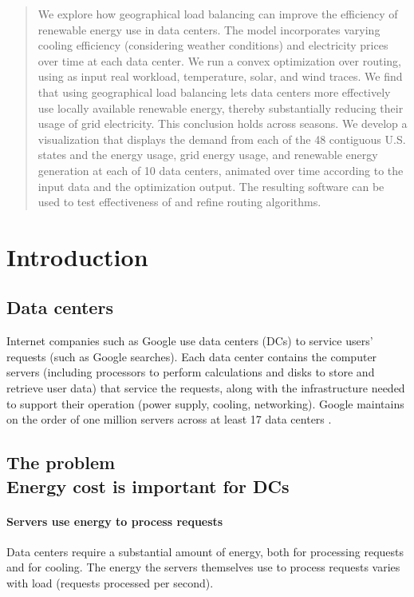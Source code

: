 \documentclass{acm_proc_article-sp}
\begin{document}
\maketitle
\begin{abstract}
We explore how geographical load balancing can improve the efficiency of renewable energy use in data centers.
The model incorporates varying cooling efficiency (considering weather conditions) and electricity prices over time at each data center.
We run a convex optimization over routing, using as input real workload, temperature, solar, and wind traces.
We find that using geographical load balancing lets data centers more effectively use locally available renewable energy, thereby substantially reducing their usage of grid electricity. This conclusion holds across seasons.
We develop a visualization that displays the demand from each of the 48 contiguous U.S. states and the energy usage, grid energy usage, and renewable energy generation at each of 10 data centers, animated over time according to the input data and the optimization output. The resulting software can be used to test effectiveness of and refine routing algorithms.
\end{abstract}

\section{Introduction}

\subsection{Data centers}
		Internet companies such as Google use data centers (DCs) to service users’ requests (such as Google searches). Each data center contains the computer servers (including processors to perform calculations and disks to store and retrieve user data) that service the requests, along with the infrastructure needed to support their operation (power supply, cooling, networking).
		Google maintains on the order of one million servers \cite{google900000} \cite{koomeyreport} across at least 17 data centers \cite{googlenumdcs}.
		
\subsection{The problem\\Energy cost is important for DCs}
		\paragraph{Servers use energy to process requests}
			Data centers require a substantial amount of energy, both for processing requests and for cooling. The energy the servers themselves use to process requests varies with load (requests processed per second).
			
\end{document}

